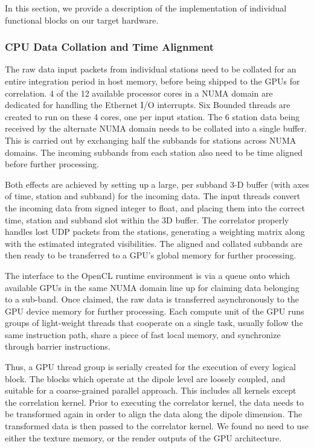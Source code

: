 \documentclass{ws-jai}
\begin{document}
In this  section, we provide a  description of the implementation  of individual
functional blocks on our target hardware.\\

\subsubsection  {CPU Data Collation and  Time Alignment}
 The raw  data input
packets from individual  stations need to be collated for  an entire integration
period in host memory,  before being shipped to the GPUs  for correlation.  4 of
the  12  available processor  cores  in  a NUMA  domain  are dedicated for handling the 
 Ethernet I/O interrupts.  Six Bounded threads
are created to run  on these 4 cores, one per input station.  The 6 station data
being received by the  alternate NUMA domain needs to be  collated into a single
buffer. This is carried out by  exchanging half the subbands for stations across
NUMA domains.   The incoming  subbands from  each station also  need to  be time
aligned before further processing.

Both effects are  achieved by setting up  a large, per subband  3-D buffer (with
axes of  time, station  and subband)  for the incoming  data. The  input threads
convert the  incoming data from signed  integer to float, and  placing them into
the correct time, station and subband slot within the 3D buffer.  The correlator
properly  handles lost  UDP packets  from the  stations, generating  a weighting
matrix  along  with the  estimated  integrated  visibilities.  The  aligned  and
collated subbands are then ready to be  transferred to a GPU's global memory for
further processing.

The  interface to  the OpenCL  runtime  environment is  via a  queue onto  which
available GPUs in the same NUMA domain  line up for claiming data belonging to a
sub-band.  Once claimed,  the raw data is transferred asynchronously  to the GPU
device memory for  further processing. Each compute unit of  the GPU runs groups
of light-weight threads that cooperate on a single task, usually follow the same
instruction path,  share a piece of  fast local memory, and  synchronize through
barrier instructions.

Thus, a GPU thread group is serially  created for the execution of every logical
block.  The  blocks which operate at  the dipole level are  loosely coupled, and
suitable  for a  coarse-grained parallel  approach.  This  includes all  kernels
except the  correlation kernel.  Prior  to executing the correlator  kernel, the
data needs to be  transformed again in order to align the  data along the dipole
dimension. The  transformed data  is then  passed to  the correlator  kernel. We
found no need to use either the texture memory, or the render outputs of the GPU
architecture.\\
\end{document}
